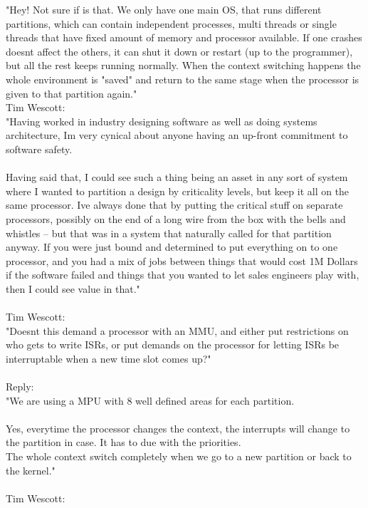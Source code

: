 "Hey! Not sure if is that. We only have one main OS, that runs different partitions, which can contain
independent processes, multi threads or single threads that have fixed amount of memory and processor
available. If one crashes doesn\textquotesingle t affect the others, it can shut it down or restart (up to the
programmer), but all the rest keeps running normally. When the context switching happens the whole
environment is "saved" and return to the same stage when the processor is given to that partition again."
\\
Tim Wescott:\\

"Having worked in industry designing software as well as doing systems architecture, I\textquotesingle m very cynical
about anyone having an up-front commitment to software safety.\\
\\
Having said that, I could see such a thing being an asset in any sort of system where I wanted to
partition a design by criticality levels, but keep it all on the same processor.  I\textquotesingle ve always done that by
putting the critical stuff on separate processors, possibly on the end of a long wire from the box with
the bells and whistles -- but that was in a system that naturally called for that partition anyway.  If
you were just bound and determined to put everything on to one processor, and you had a mix of jobs
between things that would cost 1M Dollars if the software failed and things that you wanted to let sales
engineers play with, then I could see value in that."\\
\\
Tim Wescott:\\

"Doesn\textquotesingle t this demand a processor with an MMU, and either put restrictions on who gets to write ISRs, or
put demands on the processor for letting ISRs be interruptable when a new time slot comes up?"\\
\\
Reply:\\

"We are using a MPU with 8 well defined areas for each partition.\\
\\

Yes, everytime the processor changes the context, the interrupts will change to the partition in case. It
has to due with the priorities.\\
The whole context switch completely when we go to a new partition or back to the kernel."\\
\\
Tim Wescott:\\

